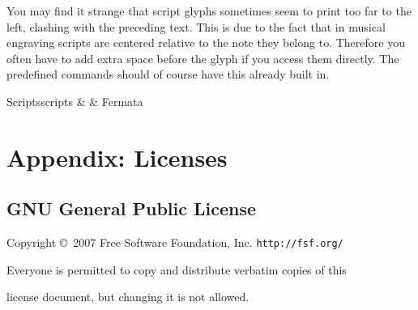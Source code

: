 \documentclass{article}
\begin{document}
You may find it strange that script glyphs sometimes seem to print too far to the left, clashing with the preceding text.
This is due to the fact that in musical engraving scripts are centered relative to the note they belong to.
Therefore you often have to add extra space before the glyph if you access them directly.
The predefined commands should of course have this already built in.

\begin{reftable}{Scripts}{scripts}
\fermata &  & Fermata\\
\end{reftable}

\pagebreak
\appendix
\small
\section{Appendix: Licenses}

\subsection{GNU General Public License}
\label{subsubsec:gpl}

\begin{center}
{\parindent 0in

Copyright \copyright\  2007 Free Software Foundation, Inc. \texttt{http://fsf.org/}

\bigskip
Everyone is permitted to copy and distribute verbatim copies of this

license document, but changing it is not allowed.}

\end{center}
\end{document}
